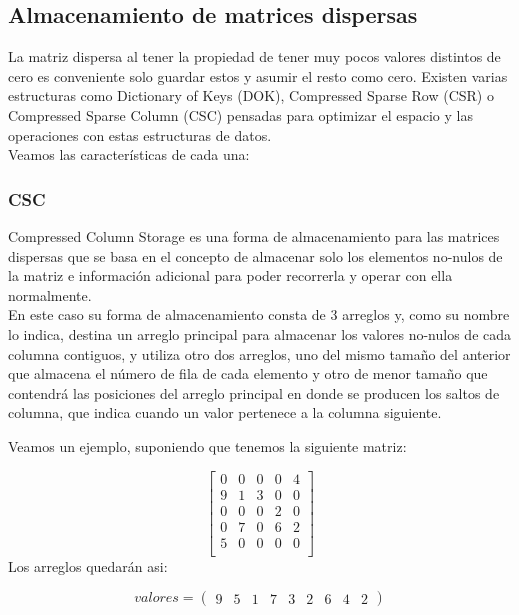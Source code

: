 \subsection{Almacenamiento de matrices dispersas}
 
 La matriz dispersa al tener la propiedad de tener muy pocos valores distintos de cero es conveniente solo guardar estos y asumir el resto como cero. Existen varias estructuras como Dictionary of Keys (DOK), Compressed Sparse Row (CSR) o Compressed Sparse Column (CSC) pensadas para optimizar el espacio y las operaciones con estas estructuras de datos.\\
 Veamos las características de cada una: 

\subsubsection{CSC}
Compressed Column Storage es una forma de almacenamiento para las matrices dispersas que se basa en el concepto de almacenar solo los elementos no-nulos de la matriz e información adicional para poder recorrerla y operar con ella normalmente. \\
En este caso su forma de almacenamiento consta de 3 arreglos y, como su nombre lo indica, destina un arreglo principal para almacenar los valores no-nulos de cada columna contiguos, y utiliza otro dos arreglos, uno del mismo tamaño del anterior que almacena el número de fila de cada elemento y otro de menor tamaño que contendrá las posiciones del arreglo principal en donde se producen los saltos de columna, que indica cuando un valor pertenece a la columna siguiente.

Veamos un ejemplo, suponiendo que tenemos la siguiente matriz:


   $$ 
\begin{bmatrix}
       0    &      0    &   0       &   0           &  4    \\
       9    &   1  &   3 &   0           &   0    \\
       0    &      0    &   0       &  2      &   0    \\
       0    &      7    &   0       &   6      &   2    \\
 5    &      0    &   0       &   0           &   0    \\
\end{bmatrix} 
$$
Los arreglos quedarán asi:


\[ valores= \left( \begin{array}{ccccccccc}
9 & 5 & 1 & 7 & 3 & 2 & 6 & 4 & 2\end{array} 
\right)\] 

